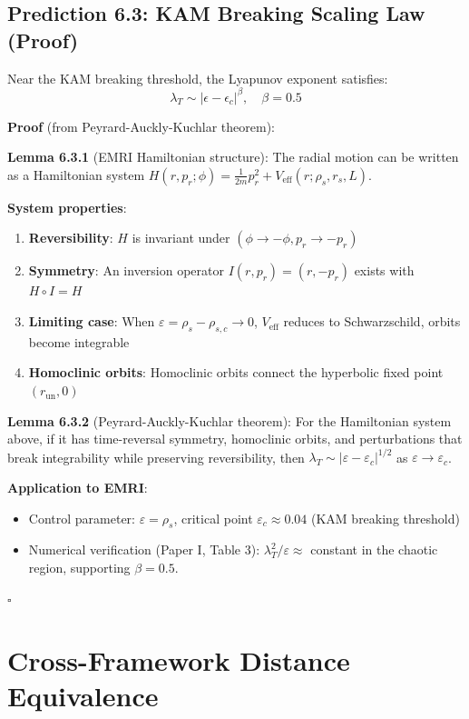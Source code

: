\documentclass[12pt]{article}
\begin{document}
\subsection{Prediction 6.3: KAM Breaking Scaling Law (Proof)}

Near the KAM breaking threshold, the Lyapunov exponent satisfies:
\begin{equation}
\lambda_T \sim |\epsilon - \epsilon_c|^\beta, \quad \beta = 0.5
\end{equation}

\textbf{Proof} (from Peyrard-Auckly-Kuchlar theorem):

\textbf{Lemma 6.3.1} (EMRI Hamiltonian structure): The radial motion can be written as a Hamiltonian system $H(r, p_r; \phi) = \frac{1}{2m}p_r^2 + V_{\text{eff}}(r; \rho_s, r_s, L)$.

\textbf{System properties}:
\begin{enumerate}
\item \textbf{Reversibility}: $H$ is invariant under $(\phi \to -\phi, p_r \to -p_r)$
\item \textbf{Symmetry}: An inversion operator $I(r, p_r) = (r, -p_r)$ exists with $H \circ I = H$
\item \textbf{Limiting case}: When $\varepsilon = \rho_s - \rho_{s,c} \to 0$, $V_{\text{eff}}$ reduces to Schwarzschild, orbits become integrable
\item \textbf{Homoclinic orbits}: Homoclinic orbits connect the hyperbolic fixed point $(r_{\text{un}}, 0)$
\end{enumerate}

\textbf{Lemma 6.3.2} (Peyrard-Auckly-Kuchlar theorem): For the Hamiltonian system above, if it has time-reversal symmetry, homoclinic orbits, and perturbations that break integrability while preserving reversibility, then $\lambda_T \sim |\varepsilon - \varepsilon_c|^{1/2}$ as $\varepsilon \to \varepsilon_c$.

\textbf{Application to EMRI}:
\begin{itemize}
\item Control parameter: $\varepsilon = \rho_s$, critical point $\varepsilon_c \approx 0.04$ (KAM breaking threshold)
\item Numerical verification (Paper I, Table 3): $\lambda_T^2/\varepsilon \approx$ constant in the chaotic region, supporting $\beta = 0.5$.
\end{itemize}
$\square$

\section{Cross-Framework Distance Equivalence}
\end{document}
